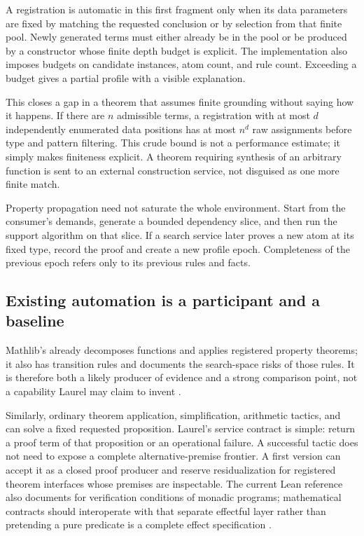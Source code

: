 \documentclass[11pt,a4paper]{article}
\newcommand{\code}[1]{\texttt{\detokenize{#1}}}
\theoremstyle{definition}
\theoremstyle{remark}
\begin{document}
A registration is automatic in this first fragment only when its data parameters are fixed by matching the requested conclusion or by selection from that finite pool. Newly generated terms must either already be in the pool or be produced by a constructor whose finite depth budget is explicit. The implementation also imposes budgets on candidate instances, atom count, and rule count. Exceeding a budget gives a partial profile with a visible explanation.

This closes a gap in a theorem that assumes finite grounding without saying how it happens. If there are $n$ admissible terms, a registration with at most $d$ independently enumerated data positions has at most $n^d$ raw assignments before type and pattern filtering. This crude bound is not a performance estimate; it simply makes finiteness explicit. A theorem requiring synthesis of an arbitrary function is sent to an external construction service, not disguised as one more finite match.

Property propagation need not saturate the whole environment. Start from the consumer's demands, generate a bounded dependency slice, and then run the support algorithm on that slice. If a search service later proves a new atom at its fixed type, record the proof and create a new profile epoch. Completeness of the previous epoch refers only to its previous rules and facts.

\subsection{Existing automation is a participant and a baseline}
Mathlib's \code{fun_prop} already decomposes functions and applies registered property theorems; it also has transition rules and documents the search-space risks of those rules. It is therefore both a likely producer of evidence and a strong comparison point, not a capability Laurel may claim to invent \cite{funprop}.

Similarly, ordinary theorem application, simplification, arithmetic tactics, and \code{grind} can solve a fixed requested proposition. Laurel's service contract is simple: return a proof term of that proposition or an operational failure. A successful tactic does not need to expose a complete alternative-premise frontier. A first version can accept it as a closed proof producer and reserve residualization for registered theorem interfaces whose premises are inspectable. The current Lean reference also documents \code{mvcgen} for verification conditions of monadic programs; mathematical contracts should interoperate with that separate effectful layer rather than pretending a pure predicate is a complete effect specification \cite{mvcgen}.
\end{document}
